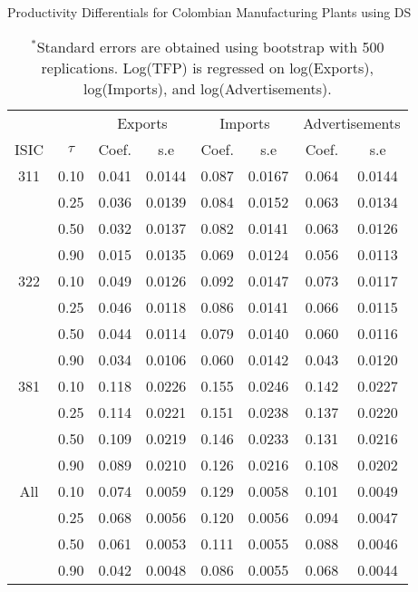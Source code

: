 \documentclass[12pt]{article}
\begin{document}
\begin{appendices}
\begin{table}[H]
\centering
\caption{Productivity Differentials for Colombian Manufacturing Plants using DS}
\small
\begin{tabular}{cccccccc}
  \hline\hline & & \multicolumn{2}{c}{Exports}  & \multicolumn{2}{c}{Imports} & \multicolumn{2}{c}{Advertisements} \\ \cmidrule(lr){3-4} \cmidrule(lr){5-6} \cmidrule(lr){7-8}ISIC & $\tau$ & Coef. & s.e & Coef. & s.e & Coef. & s.e \\ 
  \hline
311 & 0.10 & 0.041 & 0.0144 & 0.087 & 0.0167 & 0.064 & 0.0144 \\ 
   & 0.25 & 0.036 & 0.0139 & 0.084 & 0.0152 & 0.063 & 0.0134 \\ 
   & 0.50 & 0.032 & 0.0137 & 0.082 & 0.0141 & 0.063 & 0.0126 \\ 
   & 0.90 & 0.015 & 0.0135 & 0.069 & 0.0124 & 0.056 & 0.0113 \\ 
  322 & 0.10 & 0.049 & 0.0126 & 0.092 & 0.0147 & 0.073 & 0.0117 \\ 
   & 0.25 & 0.046 & 0.0118 & 0.086 & 0.0141 & 0.066 & 0.0115 \\ 
   & 0.50 & 0.044 & 0.0114 & 0.079 & 0.0140 & 0.060 & 0.0116 \\ 
   & 0.90 & 0.034 & 0.0106 & 0.060 & 0.0142 & 0.043 & 0.0120 \\ 
  381 & 0.10 & 0.118 & 0.0226 & 0.155 & 0.0246 & 0.142 & 0.0227 \\ 
   & 0.25 & 0.114 & 0.0221 & 0.151 & 0.0238 & 0.137 & 0.0220 \\ 
   & 0.50 & 0.109 & 0.0219 & 0.146 & 0.0233 & 0.131 & 0.0216 \\ 
   & 0.90 & 0.089 & 0.0210 & 0.126 & 0.0216 & 0.108 & 0.0202 \\ 
  All & 0.10 & 0.074 & 0.0059 & 0.129 & 0.0058 & 0.101 & 0.0049 \\ 
   & 0.25 & 0.068 & 0.0056 & 0.120 & 0.0056 & 0.094 & 0.0047 \\ 
   & 0.50 & 0.061 & 0.0053 & 0.111 & 0.0055 & 0.088 & 0.0046 \\ 
   & 0.90 & 0.042 & 0.0048 & 0.086 & 0.0055 & 0.068 & 0.0044 \\ 
   \hline
\end{tabular}
\caption*{\footnotesize $^{*}$Standard errors are obtained using bootstrap with 500 replications. Log(TFP) is regressed on log(Exports), log(Imports), and log(Advertisements).}
\label{QLPCOLTFPP}
\end{table}


\end{appendices}
\end{document}

